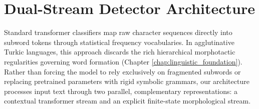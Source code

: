 \section{Dual-Stream Detector Architecture}
\label{sec:dual_stream_architecture}

Standard transformer classifiers \citep{devlin2019bert,liu2019roberta} map raw character sequences directly into subword tokens through statistical frequency vocabularies. In agglutinative Turkic languages, this approach discards the rich hierarchical morphotactic regularities governing word formation (Chapter \ref{chap:linguistic_foundation}). Rather than forcing the model to rely exclusively on fragmented subwords or replacing pretrained parameters with rigid symbolic grammars, our architecture processes input text through two parallel, complementary representations: a contextual transformer stream and an explicit finite-state morphological stream.

